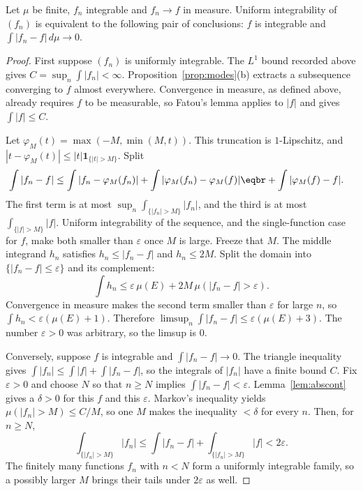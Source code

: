 \begin{theorem}\label{thm:vitali7}
Let \(\mu\) be finite, \(f_n\) integrable and \(f_n\to f\) in measure. Uniform integrability of \((f_n)\) is equivalent to the following pair of conclusions: \(f\) is integrable and \(\int|f_n-f|\,d\mu\to0\).
\end{theorem}
\begin{proof}
First suppose \((f_n)\) is uniformly integrable. The \(L^1\) bound recorded above gives \(C=\sup_n\int|f_n|<\infty\). Proposition~\ref{prop:modes}(b) extracts a subsequence converging to \(f\) almost everywhere. Convergence in measure, as defined above, already requires \(f\) to be measurable, so Fatou's lemma applies to \(|f|\) and gives \(\int|f|\le C\).

Let \(\varphi_M(t)=\max(-M,\min(M,t))\). This truncation is \(1\)-Lipschitz, and \(|t-\varphi_M(t)|\le|t|\mathbf 1_{\{|t|>M\}}\). Split
\[\begin{aligned}\int|f_n-f|&\le\int|f_n-\varphi_M(f_n)|+\int|\varphi_M(f_n)-\varphi_M(f)|\eqbr+\int|\varphi_M(f)-f|.\end{aligned}\]
The first term is at most \(\sup_n\int_{\{|f_n|>M\}}|f_n|\), and the third is at most \(\int_{\{|f|>M\}}|f|\). Uniform integrability of the sequence, and the single-function case for \(f\), make both smaller than \(\varepsilon\) once \(M\) is large. Freeze that \(M\). The middle integrand \(h_n\) satisfies \(h_n\le|f_n-f|\) and \(h_n\le2M\). Split the domain into \(\{|f_n-f|\le\varepsilon\}\) and its complement:
\[
\int h_n\le\varepsilon\,\mu(E)+2M\,\mu(|f_n-f|>\varepsilon).
\]
Convergence in measure makes the second term smaller than \(\varepsilon\) for large \(n\), so \(\int h_n<\varepsilon(\mu(E)+1)\). Therefore \(\limsup_n\int|f_n-f|\le\varepsilon(\mu(E)+3)\). The number \(\varepsilon>0\) was arbitrary, so the limsup is \(0\).

Conversely, suppose \(f\) is integrable and \(\int|f_n-f|\to0\). The triangle inequality gives \(\int|f_n|\le\int|f|+\int|f_n-f|\), so the integrals of \(|f_n|\) have a finite bound \(C\). Fix \(\varepsilon>0\) and choose \(N\) so that \(n\ge N\) implies \(\int|f_n-f|<\varepsilon\). Lemma~\ref{lem:abscont} gives a \(\delta>0\) for this \(f\) and this \(\varepsilon\). Markov's inequality yields \(\mu(|f_n|>M)\le C/M\), so one \(M\) makes the inequality \(< \delta\) for every \(n\). Then, for \(n\ge N\),
\[\int_{\{|f_n|>M\}}|f_n|\le\int|f_n-f|+\int_{\{|f_n|>M\}}|f|<2\varepsilon.\]
The finitely many functions \(f_n\) with \(n<N\) form a uniformly integrable family, so a possibly larger \(M\) brings their tails under \(2\varepsilon\) as well.
\end{proof}

